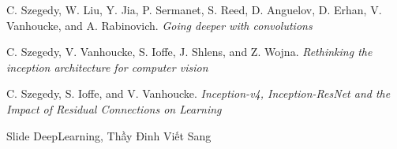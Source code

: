 \documentclass[a4paper,12pt]{report}
\begin{document}


\begin{thebibliography}{9}
 C. Szegedy, W. Liu, Y. Jia, P. Sermanet, S. Reed, D. Anguelov, D. Erhan, V. Vanhoucke, and A. Rabinovich. \textit{Going deeper with convolutions}

 C. Szegedy, V. Vanhoucke, S. Ioffe, J. Shlens, and Z. Wojna. \textit{Rethinking the inception architecture for computer vision}

 C. Szegedy, S. Ioffe, and V. Vanhoucke. \textit{Inception-v4, Inception-ResNet and the Impact of Residual Connections on Learning}

 Slide DeepLearning, Thầy Đinh Viết Sang 

\end{thebibliography}
\end{document}
